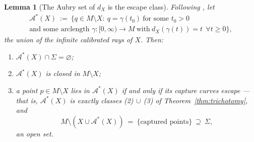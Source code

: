 \documentclass[11pt]{article}
\newtheorem{lemma}[theorem]{Lemma}
\theoremstyle{remark}
\newcommand{\X}{X}
\newcommand{\dX}{d_{\X}}
\newcommand{\Aub}{\mathcal{A}^{\ast}}
\begin{document}
\begin{lemma}[The Aubry set of $\dX$ is the escape class]
\label{lem:aubry}
Following \cite[Def.~1.4]{CCF}, let
\begin{multline*}
  \Aub(\X)\ :=\ \bigl\{q\in M\setminus\X:\ q=\gamma(t_{0})\
  \text{for some } t_{0}>0\\
  \text{and some arclength }
  \gamma:[0,\infty)\to M\ \text{with}\ \dX(\gamma(t))=t\ \ \forall
  t\ge0\bigr\},
\end{multline*}
the union of the infinite calibrated rays of $\X$. Then:
\begin{enumerate}[label=\textup{(\roman*)}]
\item $\Aub(\X)\cap\Sigma=\varnothing$;
\item $\Aub(\X)$ is closed in $M\setminus\X$;
\item a point $p\in M\setminus\X$ lies in $\Aub(\X)$ if and only if
its capture curves escape --- that is, $\Aub(\X)$ is exactly classes
\textup{(2)}$\,\cup\,$\textup{(3)} of
Theorem~\ref{thm:trichotomy}, and
\[
  M\setminus(\X\cup\Aub(\X))\ =\ \{\text{captured points}\}\
  \supseteq\ \Sigma ,
\]
an open set.
\end{enumerate}
\end{lemma}
\end{document}
